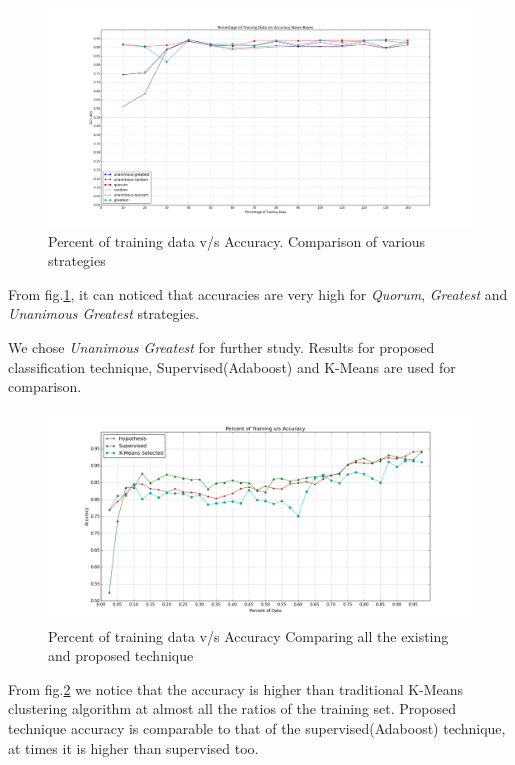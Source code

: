 \documentclass[conference]{IEEEtran}
\begin{document}
\begin{figure}[!t]
	\centering
	\includegraphics[width=7.16in]{hypothesis_updated}
	\caption{Percent of training data v/s Accuracy. Comparison of various strategies }
	\label{fig:hypo_updated}
\end{figure}
From fig.\ref{fig:hypo_updated}, it can noticed that accuracies are very high for \emph{Quorum}, \emph{Greatest} and \emph{Unanimous Greatest} strategies.

We chose \emph{Unanimous Greatest} for further study. Results for proposed classification technique, Supervised(Adaboost) and K-Means are used for comparison.
\begin{figure}[!t]
	\centering
	\includegraphics[width=7.16in]{super_hypo_accuracy_percent_training}
	\caption{Percent of training data v/s Accuracy Comparing all the existing and proposed technique}
	\label{fig:super_hypo}
\end{figure}
From fig.\ref{fig:super_hypo} we notice that the accuracy is higher than traditional K-Means clustering algorithm at almost all the ratios of the training set. Proposed technique accuracy is comparable to that of the supervised(Adaboost) technique, at times it is higher than supervised too.
\end{document}
